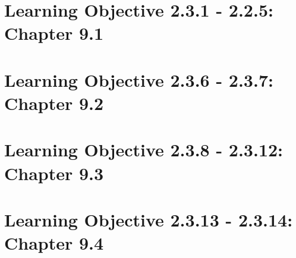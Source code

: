 \documentclass[11pt, letterpaper]{article}
\begin{document}
\section*{Learning Objective 2.3.1 - 2.2.5: Chapter 9.1}




\section*{Learning Objective 2.3.6 - 2.3.7: Chapter 9.2}




\section*{Learning Objective 2.3.8 - 2.3.12: Chapter 9.3}




\section*{Learning Objective 2.3.13 - 2.3.14: Chapter 9.4}
\end{document}
